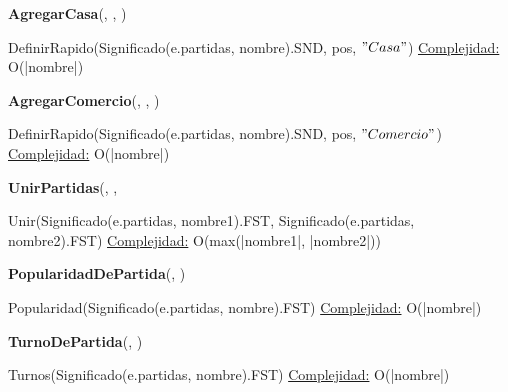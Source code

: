 \begin{Algoritmos}
\begin{algorithm}[H]{\textbf{AgregarCasa}(, , )}
\begin{algorithmic}[1]
    \State DefinirRapido(Significado(e.partidas, nombre).SND, pos, $"Casa"$)
    \State \Return
    \medskip
    \Statex \underline{Complejidad:} O(|nombre|)
\end{algorithmic}
\end{algorithm}

\begin{algorithm}[H]{\textbf{AgregarComercio}(, , )}
\begin{algorithmic}[1]
    \State DefinirRapido(Significado(e.partidas, nombre).SND, pos, $"Comercio"$)
    \State \Return
    \medskip
    \Statex \underline{Complejidad:} O(|nombre|)
\end{algorithmic}
\end{algorithm}

\begin{algorithm}[H]{\textbf{UnirPartidas}(, , }
\begin{algorithmic}[1]
    \State Unir(Significado(e.partidas, nombre1).FST, Significado(e.partidas, nombre2).FST)
    \State \Return
    \medskip
    \Statex \underline{Complejidad:} O(max(|nombre1|, |nombre2|))
\end{algorithmic}
\end{algorithm}

\begin{algorithm}[H]{\textbf{PopularidadDePartida}(, )}
\begin{algorithmic}[1]
    \State \Return Popularidad(Significado(e.partidas, nombre).FST)
    \medskip
    \Statex \underline{Complejidad:} O(|nombre|)
\end{algorithmic}
\end{algorithm}

\begin{algorithm}[H]{\textbf{TurnoDePartida}(, )}
\begin{algorithmic}[1]
    \State \Return Turnos(Significado(e.partidas, nombre).FST)
    \medskip
    \Statex \underline{Complejidad:} O(|nombre|)
\end{algorithmic}
\end{algorithm}
  
\end{Algoritmos}